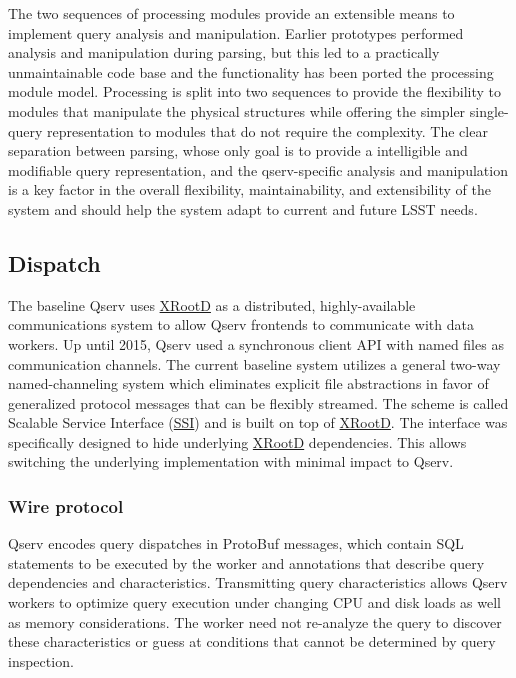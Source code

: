 \documentclass[DM,lsstdraft,toc]{lsstdoc}
\begin{document}
The two sequences of processing modules provide an extensible means to
implement query analysis and manipulation. Earlier prototypes performed
analysis and manipulation during parsing, but this led to a practically
unmaintainable code base and the functionality has been ported the
processing module model. Processing is split into two sequences to
provide the flexibility to modules that manipulate the physical
structures while offering the simpler single-query representation to
modules that do not require the complexity. The clear separation between
parsing, whose only goal is to provide a intelligible and modifiable
query representation, and the qserv-specific analysis and manipulation
is a key factor in the overall flexibility, maintainability, and
extensibility of the system and should help the system adapt to current
and future LSST needs.

\subsection{Dispatch}\label{dispatch}

The baseline Qserv uses \href{http://xrootd.org}{XRootD} as a
distributed, highly-available communications system to allow Qserv
frontends to communicate with data workers. Up until 2015, Qserv used a
synchronous client API with named files as communication channels. The
current baseline system utilizes a general two-way named-channeling
system which eliminates explicit file abstractions in favor of
generalized protocol messages that can be flexibly streamed. The scheme
is called Scalable Service Interface (\href{}{SSI}) and is built on top
of \href{http://xrootd.org}{XRootD}. The interface was specifically
designed to hide underlying \href{http://xrootd.org}{XRootD}
dependencies. This allows switching the underlying implementation with
minimal impact to Qserv.

\subsubsection{Wire protocol}\label{wire-protocol}

Qserv encodes query dispatches in ProtoBuf messages, which contain SQL
statements to be executed by the worker and annotations that describe
query dependencies and characteristics. Transmitting query
characteristics allows Qserv workers to optimize query execution under
changing CPU and disk loads as well as memory considerations. The worker
need not re-analyze the query to discover these characteristics or guess
at conditions that cannot be determined by query inspection.
\end{document}
